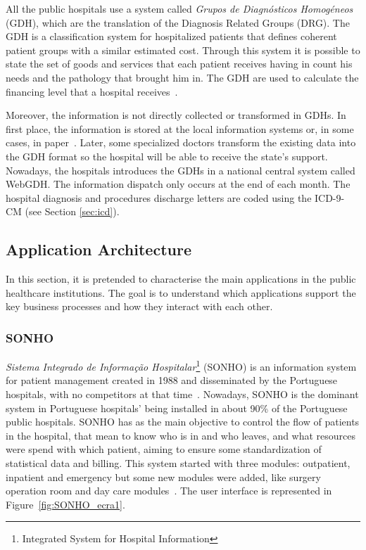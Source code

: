 All the public hospitals use a system called \textit{Grupos de Diagnósticos Homogéneos} (GDH), which are the translation of the  Diagnosis Related Groups (DRG). The GDH is a classification system for hospitalized patients that defines coherent patient groups with a similar estimated cost. Through this system it is possible to state the set of goods and services that each patient receives having in count his needs and the pathology that brought him in. The GDH are used to calculate the financing level that a hospital receives~\citep{GDH2011}.

Moreover, the information is not directly collected or transformed in GDHs. In first place, the information is stored at the local information systems or, in some cases, in paper~\citep{Ferreira2008}. Later, some specialized doctors transform the existing data into the GDH format so the hospital will be able to receive the state's support. Nowadays, the hospitals introduces the GDHs in a national central system called WebGDH. The information dispatch only occurs at the end of each month. The hospital diagnosis and procedures discharge letters are coded using the ICD-9-CM (see Section \ref{sec:icd}).


\subsection{Application Architecture}

In this section, it is pretended to characterise the main applications in the public healthcare institutions. The goal is to understand which applications support the key business processes and how they interact with each other.


\subsubsection{SONHO}

\textit{Sistema Integrado de Informação Hospitalar}\footnote{Integrated System for Hospital Information} (SONHO) is an information system for patient management created in 1988 and disseminated by the Portuguese hospitals, with no competitors at that time~\citep{Teixeira2005}. Nowadays, SONHO is the dominant system in Portuguese hospitals' being installed in about 90\% of the Portuguese public hospitals. SONHO has as the main objective to control the flow of patients in the hospital, that mean to know who is in and who leaves, and what resources were spend with which patient, aiming to ensure some standardization of statistical data and billing. This system started with three modules: outpatient, inpatient and emergency but some new modules were added, like surgery operation room and day care modules~\citep{Cruz-correia}. The user interface is represented in Figure~\ref{fig:SONHO_ecra1}.

